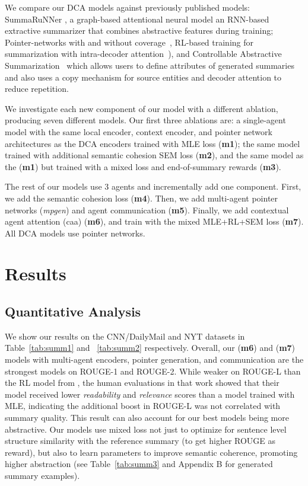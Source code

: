 \documentclass[11pt,a4paper]{article}
\begin{document}
We compare our DCA models against previously published models: SummaRuNNer \cite{summs2s}, a graph-based attentional neural model \cite{graphbased} an RNN-based extractive summarizer that combines abstractive features during training; Pointer-networks with and without coverage~\cite{summpoinernet}, RL-based training for summarization with intra-decoder attention~\cite{rlsummsocher}),
and Controllable Abstractive Summarization~\cite{controllable} which allows users to define attributes of generated summaries and also uses a copy mechanism for source entities and decoder attention to reduce repetition.

We investigate each new component of our model with a different ablation, producing seven different models. Our first three ablations are: a single-agent model with the same local encoder, context encoder, and pointer network architectures as the DCA encoders trained with MLE loss  (\textbf{m1}); the same model trained with additional semantic cohesion SEM loss (\textbf{m2}), and the same model as the (\textbf{m1}) but trained with a mixed loss and end-of-summary rewards (\textbf{m3}).

The rest of our models use 3 agents and incrementally add one component. First, we add the semantic cohesion loss (\textbf{m4}). Then, we add multi-agent pointer networks (\textit{mpgen}) and agent communication (\textbf{m5}). Finally, we add contextual agent attention (caa) (\textbf{m6}), and train with the mixed MLE+RL+SEM loss (\textbf{m7}). All DCA models use pointer networks. \section{Results}
\subsection{Quantitative Analysis}
We show our results on the CNN/DailyMail and NYT datasets in Table~\ref{tab:summ1} and ~\ref{tab:summ2} respectively. Overall, our (\textbf{m6}) and (\textbf{m7}) models with multi-agent encoders, pointer generation, and communication are the strongest models on ROUGE-1 and ROUGE-2. While weaker on ROUGE-L than the RL model from \citet{rlsummsocher}, the human evaluations in that work showed that their model received lower \textit{readability} and \textit{relevance} scores than a model trained with MLE, indicating the additional boost in ROUGE-L was not correlated with summary quality. This result can also account for our best models being more abstractive. Our models use mixed loss not just to optimize for sentence level structure similarity with the reference summary (to get higher ROUGE as reward), but also to learn parameters to improve semantic coherence, promoting higher abstraction (see Table~\ref{tab:summ3} and Appendix B for generated summary examples).
\end{document}
